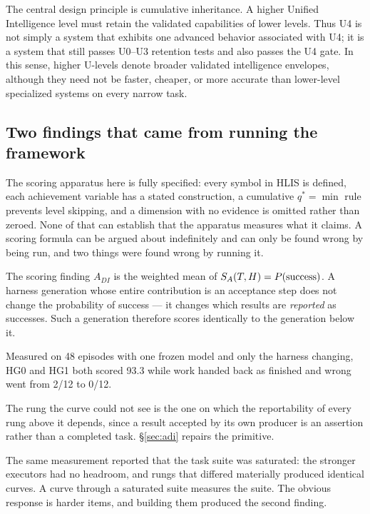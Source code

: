 The central design principle is cumulative inheritance. A higher Unified Intelligence level must retain the validated capabilities of lower levels. Thus U4 is not simply a system that exhibits one advanced behavior associated with U4; it is a system that still passes U0--U3 retention tests and also passes the U4 gate. In this sense, higher U-levels denote broader validated intelligence envelopes, although they need not be faster, cheaper, or more accurate than lower-level specialized systems on every narrow task.

\subsection{Two findings that came from running the framework}

The scoring apparatus here is fully specified: every symbol in HLIS is defined, each achievement variable has a stated construction, a cumulative $q^{*}=\min$ rule prevents level skipping, and a dimension with no evidence is omitted rather than zeroed. None of that can establish that the apparatus measures what it claims. A scoring formula can be argued about indefinitely and can only be found wrong by being run, and two things were found wrong by running it.

\begin{cautionbox}{The scoring finding}
$A_{DI}$ is the weighted mean of $S_A(T,H){} = P(\text{success})$. A harness generation whose entire contribution is an acceptance step does not change the probability of success --- it changes which results are \emph{reported} as successes. Such a generation therefore scores identically to the generation below it.

Measured on 48 episodes with one frozen model and only the harness changing, HG0 and HG1 both scored 93.3 while work handed back as finished and wrong went from 2/12 to 0/12.

The rung the curve could not see is the one on which the reportability of every rung above it depends, since a result accepted by its own producer is an assertion rather than a completed task. \S\ref{sec:adi} repairs the primitive.
\end{cautionbox}

The same measurement reported that the task suite was saturated: the stronger executors had no headroom, and rungs that differed materially produced identical curves. A curve through a saturated suite measures the suite. The obvious response is harder items, and building them produced the second finding.

